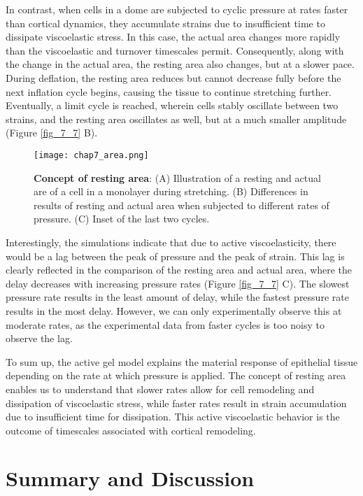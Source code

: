 In contrast, when cells in a dome are subjected to cyclic pressure at
rates faster than cortical dynamics, they accumulate strains due to
insufficient time to dissipate viscoelastic stress. In this case, the
actual area changes more rapidly than the viscoelastic and turnover
timescales permit. Consequently, along with the change in the actual
area, the resting area also changes, but at a slower pace. During
deflation, the resting area reduces but cannot decrease fully before the
next inflation cycle begins, causing the tissue to continue stretching
further. Eventually, a limit cycle is reached, wherein cells stably
oscillate between two strains, and the resting area oscillates as well,
but at a much smaller amplitude (Figure \ref{fig_7_7} B).


\begin{figure}
	\centering
	\texttt{[image: chap7\_area.png]}
	\caption{\label{fig_7_8} \textbf{Concept of resting area}: (A) Illustration of a resting and actual are of a cell in a monolayer during stretching. (B) Differences in results of resting and actual area when subjected to different rates of pressure. (C) Inset of the last two cycles.
	}
\end{figure}

Interestingly, the simulations indicate that due to active
viscoelasticity, there would be a lag between the peak of pressure and
the peak of strain. This lag is clearly reflected in the comparison of
the resting area and actual area, where the delay decreases with
increasing pressure rates (Figure \ref{fig_7_7} C).
The slowest pressure rate results in the least amount of delay, while
the fastest pressure rate results in the most delay. However, we can
only experimentally observe this at moderate rates, as the experimental
data from faster cycles is too noisy to observe the lag.

To sum up, the active gel model explains the material response of
epithelial tissue depending on the rate at which pressure is applied.
The concept of resting area enables us to understand that slower rates
allow for cell remodeling and dissipation of viscoelastic stress, while
faster rates result in strain accumulation due to insufficient time for
dissipation. This active viscoelastic behavior is the outcome of
timescales associated with cortical remodeling.

\newpage
\hypertarget{summary}{%
	\section{Summary and Discussion}\label{summary}}

